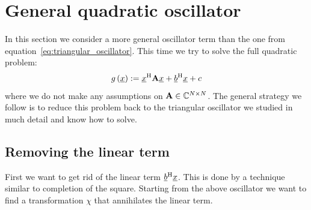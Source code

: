 \documentclass[a4paper,10pt]{article}
\begin{document}
\section{General quadratic oscillator}


In this section we consider a more general oscillator term
than the one from equation~\eqref{eq:triangular_oscillator}.
This time we try to solve the full quadratic problem:
\begin{equation}\label{eq:general_oscillator}
  g\left(\underline{x}\right) := \underline{x}{}^{\textnormal{H}} \mathbf{A} \underline{x} + \underline{b}{}^{\textnormal{H}} \underline{x} + c
\end{equation}
where we do not make any assumptions on $\mathbf{A} \in \mathbb{C}^{N \times N}$.
The general strategy we follow is to reduce this problem back to the
triangular oscillator we studied in much detail and know how to solve.


\subsection{Removing the linear term}


First we want to get rid of the linear term $\underline{b}{}^{\textnormal{H}} \underline{x}$.
This is done by a technique similar to completion of the square.
Starting from the above oscillator we want to find a transformation
$\chi$ that annihilates the linear term.
\end{document}
